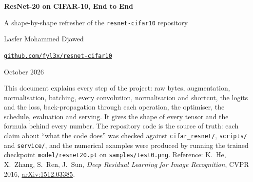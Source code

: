 
\usepackage{cancel}

\begin{titlepage}
\centering
\vspace*{2.2cm}
{\Huge\bfseries ResNet-20 on CIFAR-10, End to End\par}
\vspace{0.4cm}
{\Large A shape-by-shape refresher of the \texttt{resnet-cifar10} repository\par}
\vspace{1.2cm}
\vspace{1.2cm}

{\large Lasfer Mohammed Djawed\par}
\vspace{0.2cm}
{\normalsize \href{https://github.com/fyl3x/resnet-cifar10}{\texttt{github.com/fyl3x/resnet-cifar10}}\par}
\vspace{0.2cm}
{\normalsize October 2026\par}
\vfill
\begin{minipage}{0.86\linewidth}\small
This document explains every step of the project: raw bytes, augmentation, normalisation, batching, every convolution, normalisation and shortcut, the logits and the loss, back-propagation through each operation, the optimiser, the schedule, evaluation and serving. It gives the shape of every tensor and the formula behind every number. The repository code is the source of truth: each claim about ``what the code does'' was checked against \texttt{cifar\_resnet/}, \texttt{scripts/} and \texttt{service/}, and the numerical examples were produced by running the trained checkpoint \texttt{model/resnet20.pt} on \texttt{samples/test0.png}. Reference: K.~He, X.~Zhang, S.~Ren, J.~Sun, \emph{Deep Residual Learning for Image Recognition}, CVPR 2016, \href{https://arxiv.org/abs/1512.03385}{arXiv:1512.03385}.
\end{minipage}
\vspace{0.8cm}
\end{titlepage}

\tableofcontents
\newpage









\clearpage

\clearpage


